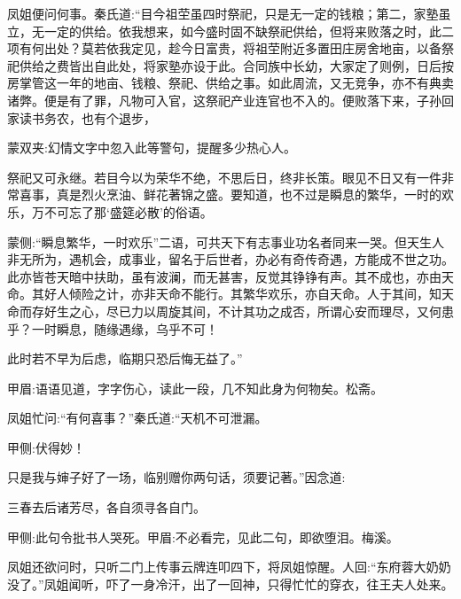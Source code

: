 \begin{parag}
    凤姐便问何事。秦氏道:“目今祖茔虽四时祭祀，只是无一定的钱粮；第二，家塾虽立，无一定的供给。依我想来，如今盛时固不缺祭祀供给，但将来败落之时，此二项有何出处？莫若依我定见，趁今日富贵，将祖茔附近多置田庄房舍地亩，以备祭祀供给之费皆出自此处，将家塾亦设于此。合同族中长幼，大家定了则例，日后按房掌管这一年的地亩、钱粮、祭祀、供给之事。如此周流，又无竞争，亦不有典卖诸弊。便是有了罪，凡物可入官，这祭祀产业连官也不入的。便败落下来，子孙回家读书务农，也有个退步，\begin{note}蒙双夹:幻情文字中忽入此等警句，提醒多少热心人。\end{note}祭祀又可永继。若目今以为荣华不绝，不思后日，终非长策。眼见不日又有一件非常喜事，真是烈火烹油、鲜花著锦之盛。要知道，也不过是瞬息的繁华，一时的欢乐，万不可忘了那‘盛筵必散’的俗语。\begin{note}蒙侧:“瞬息繁华，一时欢乐”二语，可共天下有志事业功名者同来一哭。但天生人非无所为，遇机会，成事业，留名于后世者，办必有奇传奇遇，方能成不世之功。此亦皆苍天暗中扶助，虽有波澜，而无甚害，反觉其铮铮有声。其不成也，亦由天命。其好人倾险之计，亦非天命不能行。其繁华欢乐，亦自天命。人于其间，知天命而存好生之心，尽已力以周旋其间，不计其功之成否，所谓心安而理尽，又何患乎？一时瞬息，随缘遇缘，乌乎不可！\end{note}此时若不早为后虑，临期只恐后悔无益了。”\begin{note}甲眉:语语见道，字字伤心，读此一段，几不知此身为何物矣。松斋。\end{note}凤姐忙问:“有何喜事？”秦氏道:“天机不可泄漏。\begin{note}甲侧:伏得妙！\end{note}只是我与婶子好了一场，临别赠你两句话，须要记著。”因念道:
\end{parag}


\begin{poem}
    \begin{pl}三春去后诸芳尽，各自须寻各自门。\end{pl}
    \begin{note}甲侧:此句令批书人哭死。甲眉:不必看完，见此二句，即欲堕泪。梅溪。\end{note}
\end{poem}


\begin{parag}
    凤姐还欲问时，只听二门上传事云牌连叩四下，将凤姐惊醒。人回:“东府蓉大奶奶没了。”凤姐闻听，吓了一身冷汗，出了一回神，只得忙忙的穿衣，往王夫人处来。
\end{parag}


